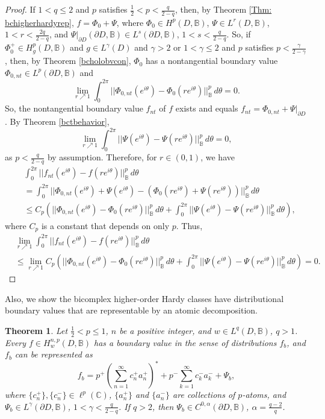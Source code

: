 \documentclass[suppldata]{interact}
\theoremstyle{plain}%
\newtheorem{theorem}{Theorem}[section]
\theoremstyle{definition}
\theoremstyle{remark}
\newcommand{\C}{\mathbb C}
\newcommand{\p}{\partial}
\newcommand{\bc}{\mathbb{B}}
\begin{document}
\begin{proof}
If $1 < q \leq 2$ and $p$ satisfies $\frac{1}{2} < p < \frac{q}{2-q}$, then, by Theorem \ref{Thm: bchigherhardyrep}, $f = \Phi_0 + \Psi$, where $\Phi_0 \in H^p(D,\bc)$, $\Psi \in L^r(D, \bc)$, $1 < r < \frac{2q}{2-q}$, and $\Psi|_{\p D}(\p D, \bc) \in L^s(\p D, \bc)$, $1 < s < \frac{q}{2-q}$. So, if $\Phi_0^+ \in H^p_g(D,\bc)$ and $g \in L^\gamma(D)$ and $\gamma > 2$ or $1 < \gamma \leq 2$ and $p$ satisfies $p < \frac{\gamma}{2-\gamma}$, then, by Theorem \ref{bcholobvcon}, $\Phi_0$ has a nontangential boundary value $\Phi_{0,nt} \in L^p(\p D, \bc)$ and 
\[
        \lim_{r \nearrow 1} \int_0^{2\pi} ||\Phi_{0,nt}(e^{i\theta}) - \Phi_0(re^{i\theta}) ||^p_{\bc} \, d\theta  = 0. 
    \] 
So, the nontangential boundary value $f_{nt}$ of $f$ exists and equals $f_{nt} = \Phi_{0,nt} + \Psi|_{\p D}$. By Theorem \ref{bctbehavior},
\[
        \lim_{r \nearrow 1} \int_0^{2\pi} ||\Psi(e^{i\theta}) - \Psi(re^{i\theta}) ||^p_{\bc} \, d\theta  = 0, 
\]
as $p < \frac{q}{2-q}$ by assumption. Therefore, for $r \in (0,1)$, we have
\begin{align*}
    & \int_0^{2\pi} ||f_{nt}(e^{i\theta}) - f(re^{i\theta}) ||^p_{\bc} \, d\theta\\
    &= \int_0^{2\pi} ||\Phi_{0,nt}(e^{i\theta}) + \Psi(e^{i\theta}) - (\Phi_0(re^{i\theta}) + \Psi(re^{i\theta})) ||^p_{\bc} \, d\theta \\
    &\leq C_p \left( ||\Phi_{0,nt}(e^{i\theta}) - \Phi_0(re^{i\theta}) ||^p_{\bc} \, d\theta + \int_0^{2\pi} ||\Psi(e^{i\theta}) - \Psi(re^{i\theta}) ||^p_{\bc} \, d\theta \right),
\end{align*}
where $C_p$ is a constant that depends on only $p$. Thus, 
\begin{align*}
    &\lim_{r \nearrow 1} \int_0^{2\pi} ||f_{nt}(e^{i\theta}) - f(re^{i\theta}) ||^p_{\bc} \, d\theta \\
    &\leq \lim_{r \nearrow 1}C_p \left( ||\Phi_{0,nt}(e^{i\theta}) - \Phi_0(re^{i\theta}) ||^p_{\bc} \, d\theta + \int_0^{2\pi} ||\Psi(e^{i\theta}) - \Psi(re^{i\theta}) ||^p_{\bc} \, d\theta \right) = 0.
\end{align*}
\end{proof}

Also, we show the bicomplex higher-order Hardy classes have distributional boundary values that are representable by an atomic decomposition. 

\begin{theorem}\label{Thm: higheratomicbc}
Let $\frac{1}{2} < p \leq 1$, $n$ be a positive integer, and $w \in L^q(D,\bc)$, $q>1$.  Every $f \in H^{n,p}_{w}(D,\bc)$ has a boundary value in the sense of distributions $f_b$, and $f_b$ can be represented as 
    \[
        f_b = p^+ \left( \sum_{n=1}^\infty c^+_n a^+_n\right)^* + p^- \sum_{k=1}^\infty c^-_k a^-_k + \Psi_b,
    \]
    where $\{c_n^+\}, \{c_n^-\} \in \ell^p(\C)$, $\{a_n^+\}$ and $\{a_n^-\}$ are collections of $p$-atoms, and $\Psi_b \in L^\gamma(\p D,\bc)$, $1 < \gamma< \frac{q}{2-q}$. If $q>2$, then $\Psi_b \in C^{0,\alpha}(\p D,\bc)$, $\alpha = \frac{q-2}{q}$. 
\end{theorem}
\end{document}
